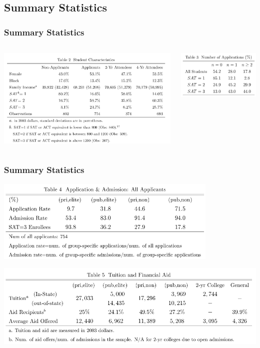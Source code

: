 \documentclass[10pt]{beamer}
\begin{document}
\subsection{Summary Statistics}
\begin{frame}[c]\frametitle{Summary Statistics}

\begin{columns}
\centerline{\includegraphics[width=\textwidth]{table2.png}}
\centerline{\includegraphics[width=\textwidth]{table3.png}}
\end{columns}

\end{frame}

\begin{frame}[c]\frametitle{Summary Statistics}

\centerline{\includegraphics[width=0.8\textwidth]{table4.png}}
\centerline{\includegraphics[width=\textwidth]{table5.png}}
\end{frame}
\end{document}
